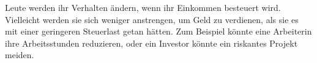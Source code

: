 Leute werden ihr Verhalten ändern, wenn ihr Einkommen besteuert wird.
Vielleicht werden sie sich weniger anstrengen, um Geld zu verdienen, als sie es mit einer geringeren Steuerlast getan hätten.
Zum Beispiel könnte eine Arbeiterin ihre Arbeitsstunden reduzieren, oder ein Investor könnte ein riskantes Projekt meiden.